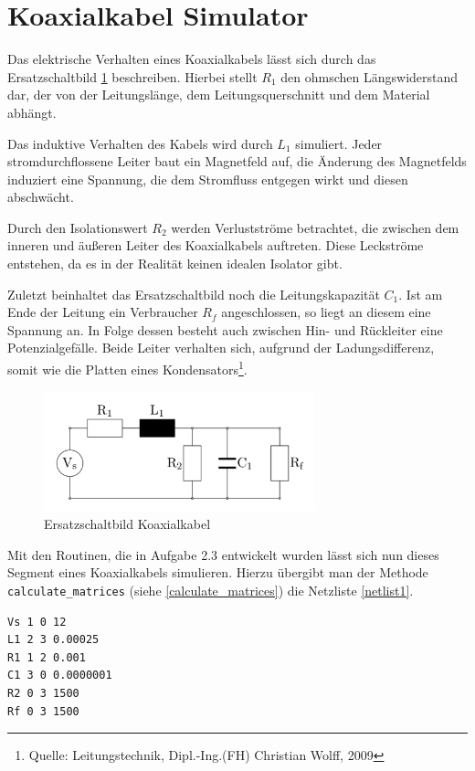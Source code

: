 \section{Koaxialkabel Simulator}\label{sec:ag3_1}

Das elektrische Verhalten eines Koaxialkabels lässt sich durch das Ersatzschaltbild \ref{koaxialkabel1} beschreiben. Hierbei stellt $R_1$ den ohmschen Längswiderstand dar, der von der Leitungslänge, dem Leitungsquerschnitt und dem Material abhängt.

Das induktive Verhalten des Kabels wird durch $L_1$ simuliert. Jeder stromdurchflossene Leiter baut ein Magnetfeld auf, die Änderung des Magnetfelds induziert eine Spannung, die dem Stromfluss entgegen wirkt und diesen abschwächt.

Durch den Isolationswert $R_2$ werden Verlustströme betrachtet, die zwischen dem inneren und äußeren Leiter des Koaxialkabels auftreten. Diese Leckströme entstehen, da es in der Realität keinen idealen Isolator gibt.

Zuletzt beinhaltet das Ersatzschaltbild noch die Leitungskapazität $C_1$. Ist am Ende der Leitung ein Verbraucher $R_f$ angeschlossen, so liegt an diesem eine Spannung an. In Folge dessen besteht auch zwischen Hin- und Rückleiter eine Potenzialgefälle. Beide Leiter verhalten sich, aufgrund der Ladungsdifferenz, somit wie die Platten eines Kondensators\footnote{Quelle: Leitungstechnik, Dipl.-Ing.(FH) Christian Wolff, 2009}. 

\begin{figure}[h]
	\centering
	\includegraphics[width=0.7\textwidth]{data/Koaxialkabel1}
	\caption{Ersatzschaltbild Koaxialkabel}
	\label{koaxialkabel1}
\end{figure}

Mit den Routinen, die in Aufgabe 2.3 entwickelt wurden lässt sich nun dieses Segment eines Koaxialkabels simulieren. Hierzu übergibt man der Methode \texttt{calculate\_matrices} (siehe \ref{calculate_matrices}) die Netzliste \ref{netlist1}.

\begin{lstlisting}[caption={Netzliste Koaxialkabel}, label=netlist1]
Vs 1 0 12
L1 2 3 0.00025
R1 1 2 0.001
C1 3 0 0.0000001
R2 0 3 1500
Rf 0 3 1500
\end{lstlisting}

